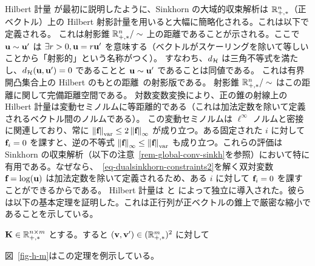 \begin{rem1}{Hilbert 計量}
\citep{franklin1989scaling}が最初に説明したように、Sinkhorn の大域的収束解析は $\mathbb{R}_{+,*}^n$（正ベクトル）上の Hilbert 射影計量を用いると大幅に簡略化される。これは以下で定義される。
これは射影錐 $\mathbb{R}_{+,*}^n/\sim$ 上の距離であることが示される。ここで $\mathrm{\textbf{u}} \sim \mathrm{\textbf{u}}'$ は $\exists r>0, \mathrm{\textbf{u}}=r\mathrm{\textbf{u}}'$ を意味する（ベクトルがスケーリングを除いて等しいことから「射影的」という名称がつく）。
すなわち、$d_{\mathcal{H}}$ は三角不等式を満たし、$d_{\mathcal{H}}(\mathrm{\textbf{u}},\mathrm{\textbf{u}}')=0$ であることと $\mathrm{\textbf{u}} \sim \mathrm{\textbf{u}}'$ であることは同値である。
これは有界開凸集合上の Hilbert のもとの距離~\citep{hilbert1895gerade}の射影版である。
射影錐 $\mathbb{R}_{+,*}^n/\sim$ はこの距離に関して完備距離空間である。
対数変数変換により、正の錐の射線上の Hilbert 計量は変動セミノルムに等距離的である（これは加法定数を除いて定義されるベクトル間のノルムである）。
この変動セミノルムは $\ell^\infty$ ノルムと密接に関連しており、常に $\left\| \mathrm{\textbf{f}} \right\|_{\text{var}}  \leq 2 \left\| \mathrm{\textbf{f}} \right\|_\infty$ が成り立つ。ある固定された $i$ に対して $\mathrm{\textbf{f}}_i=0$ を課すと、逆の不等式 $\left\| \mathrm{\textbf{f}} \right\|_\infty \leq \left\| \mathrm{\textbf{f}} \right\|_{\text{var}}$ も成り立つ。これらの評価は Sinkhorn の収束解析（以下の注意~\ref{rem-global-conv-sinkh}を参照）において特に有用である。なぜなら、~\eqref{eq-dualsinkhorn-constraints2}を解く双対変数 $\mathrm{\textbf{f}}=\log(\mathrm{\textbf{u}})$ は加法定数を除いて定義されるため、ある $i$ に対して $\mathrm{\textbf{f}}_i=0$ を課すことができるからである。
Hilbert 計量は \citep{birkhoff1957extensions} と \citep{samelson1957perron} によって独立に導入された。彼らは以下の基本定理を証明した。これは正行列が正ベクトルの錐上で厳密な縮小であることを示している。


\begin{thm}\label{thm-birkoff}
	$\mathrm{\textbf{K}} \in \mathbb{R}_{+,*}^{n \times m}$ とする。すると $(\mathrm{\textbf{v}},\mathrm{\textbf{v}}') \in (\mathbb{R}_{+,*}^m)^2$ に対して
\end{thm}

図~\ref{fig-h-m}はこの定理を例示している。
\end{rem1}


